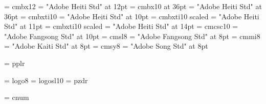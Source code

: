 \font\entwelvebf = cmbx12
\font\zhtwelvebf = "Adobe Heiti Std" at 12pt
\def\twelvebf{\entwelvebf\let\zhfont\zhtwelvebf}
\font\enthirtysixbf = cmbx10 at 36pt
\font\zhthirtysixbf = "Adobe Heiti Std" at 36pt
\def\thirtysixbf{\enthirtysixbf\let\zhfont\zhthirtysixbf}
%
\font\entenbi = cmbxti10
\font\zhtenbi = "Adobe Heiti Std" at 10pt
\def\tenbi{\entenbi\let\zhfont\zhtenbi}
\font\enelevenbi= cmbxti10 scaled \magstephalf
\font\zhelevenbi = "Adobe Heiti Std" at 11pt
\def\elevenbi{\enelevenbi\let\zhfont\zhelevenbi}
\font\enfourteenbi= cmbxti10 scaled 
\font\zhfourteenbi = "Adobe Heiti Std" at 14pt
\def\fourteenbi{\enfourteenbi\let\zhfont\zhfourteenbi}
%
\font\entensc = cmcsc10
\font\zhtensc = "Adobe Fangsong Std" at 10pt
\def\tensc{\entensc\let\zhfont\zhtensc}
\font\eneightsl = cmsl8
\font\zheightsl = "Adobe Fangsong Std" at 8pt
\def\eightsl{\eneightsl\let\zhfont\zheightsl}
\font\eneighti = cmmi8
\font\zheighti = "Adobe Kaiti Std" at 8pt
\def\eighti{\eneighti\let\zhfont\zheighti}
\font\eneightsy = cmsy8
\font\zheightsy = "Adobe Song Std" at 8pt
\def\eightsy{\eneightsy\let\zhfont\zheightsy}

 
%
\font\tenpal = pplr

% 
\font\eightlogo = logo8
\font\logosl = logosl10
\font\handfont = pzdr

\ifmsdos
   \font\cnum = cnum %
   \let\chapternumeralfont = \cnum
\fi

\def\undefinedfont{\errmessage{Undefined font}}

% 
\def\clearfonts{\let\rm = \undefinedfont \let\bf = \undefinedfont
   \let\it = \undefinedfont \let\bi = \undefinedfont
   \let\tt = \undefinedfont \let\bt = \undefinedfont
   \let\sc = \undefinedfont
   \let\ss = \undefinedfont
}

